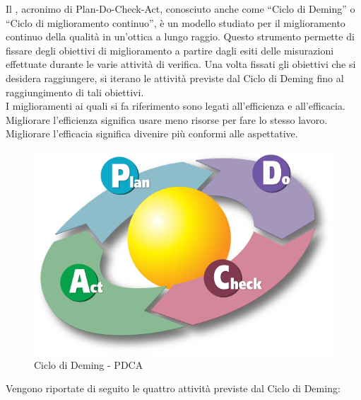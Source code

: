 
 \label{app:pdca}
Il , acronimo di Plan-Do-Check-Act, conosciuto anche come “Ciclo di Deming” o “Ciclo di miglioramento continuo”, è un modello studiato per il miglioramento continuo della qualità in un'ottica a lungo raggio. Questo strumento permette di fissare degli obiettivi di miglioramento a partire dagli esiti delle misurazioni effettuate durante le varie attività di verifica. Una volta fissati gli obiettivi che si desidera raggiungere, si iterano le attività previste dal Ciclo di Deming fino al raggiungimento di tali obiettivi.\\
I miglioramenti ai quali si fa riferimento sono legati all'efficienza e all'efficacia. Migliorare l'efficienza significa usare meno risorse per fare lo stesso lavoro. Migliorare l'efficacia significa divenire più conformi alle aspettative.\\
\begin{figure}[H]
	\centering
	\includegraphics[width=12cm]{PianoDiQualifica/Pics/PDCA_Cycle.png}
	\caption{Ciclo di Deming - PDCA}
\end{figure}
Vengono riportate di seguito le quattro attività previste dal Ciclo di Deming:
